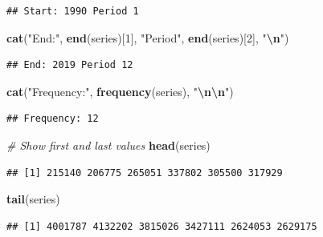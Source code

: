 \documentclass[
]{article}
\newenvironment{Shaded}{\begin{snugshade}}{\end{snugshade}}
\newcommand{\CommentTok}[1]{\textcolor[rgb]{0.56,0.35,0.01}{\textit{#1}}}
\newcommand{\DecValTok}[1]{\textcolor[rgb]{0.00,0.00,0.81}{#1}}
\newcommand{\FunctionTok}[1]{\textcolor[rgb]{0.13,0.29,0.53}{\textbf{#1}}}
\newcommand{\NormalTok}[1]{#1}
\newcommand{\SpecialCharTok}[1]{\textcolor[rgb]{0.81,0.36,0.00}{\textbf{#1}}}
\newcommand{\StringTok}[1]{\textcolor[rgb]{0.31,0.60,0.02}{#1}}
\begin{document}
\begin{verbatim}
## Start: 1990 Period 1
\end{verbatim}

\begin{Shaded}
\begin{Highlighting}[]
\FunctionTok{cat}\NormalTok{(}\StringTok{"End:"}\NormalTok{, }\FunctionTok{end}\NormalTok{(series)[}\DecValTok{1}\NormalTok{], }\StringTok{"Period"}\NormalTok{, }\FunctionTok{end}\NormalTok{(series)[}\DecValTok{2}\NormalTok{], }\StringTok{"}\SpecialCharTok{\textbackslash{}n}\StringTok{"}\NormalTok{)}
\end{Highlighting}
\end{Shaded}

\begin{verbatim}
## End: 2019 Period 12
\end{verbatim}

\begin{Shaded}
\begin{Highlighting}[]
\FunctionTok{cat}\NormalTok{(}\StringTok{"Frequency:"}\NormalTok{, }\FunctionTok{frequency}\NormalTok{(series), }\StringTok{"}\SpecialCharTok{\textbackslash{}n\textbackslash{}n}\StringTok{"}\NormalTok{)}
\end{Highlighting}
\end{Shaded}

\begin{verbatim}
## Frequency: 12
\end{verbatim}

\begin{Shaded}
\begin{Highlighting}[]
\CommentTok{\# Show first and last values}
\FunctionTok{head}\NormalTok{(series)}
\end{Highlighting}
\end{Shaded}

\begin{verbatim}
## [1] 215140 206775 265051 337802 305500 317929
\end{verbatim}

\begin{Shaded}
\begin{Highlighting}[]
\FunctionTok{tail}\NormalTok{(series)}
\end{Highlighting}
\end{Shaded}

\begin{verbatim}
## [1] 4001787 4132202 3815026 3427111 2624053 2629175
\end{verbatim}
\end{document}
